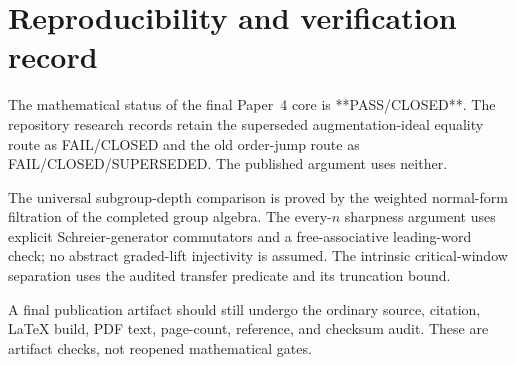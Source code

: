 \documentclass[11pt]{article}
\begin{document}
\section{Reproducibility and verification record}

The mathematical status of the final Paper~4 core is **PASS/CLOSED**.
The repository research records retain the superseded augmentation-ideal
equality route as FAIL/CLOSED and the old order-jump route as
FAIL/CLOSED/SUPERSEDED.  The published argument uses neither.

The universal subgroup-depth comparison is proved by the weighted
normal-form filtration of the completed group algebra.  The
every-$n$ sharpness argument uses explicit Schreier-generator
commutators and a free-associative leading-word check; no abstract
graded-lift injectivity is assumed.  The intrinsic critical-window
separation uses the audited transfer predicate and its truncation
bound.

A final publication artifact should still undergo the ordinary source,
citation, LaTeX build, PDF text, page-count, reference, and checksum
audit.  These are artifact checks, not reopened mathematical gates.
\end{document}
